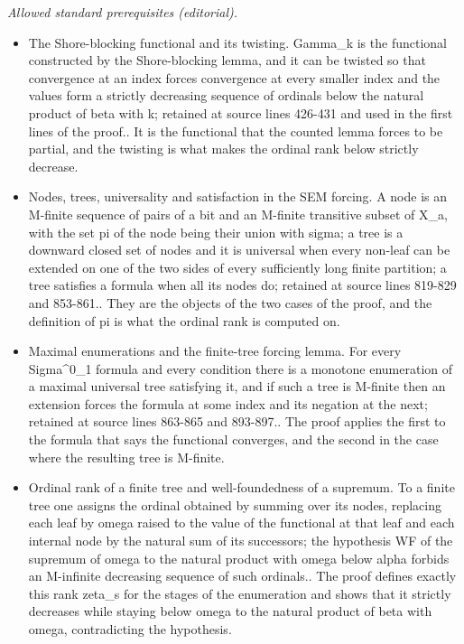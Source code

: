 \documentclass{article}
\numberwithin{theorem}{section}
\begin{document}
\noindent\textit{Allowed standard prerequisites (editorial).}\begin{itemize}
\item The Shore-blocking functional and its twisting. Gamma\_k is the functional constructed by the Shore-blocking lemma, and it can be twisted so that convergence at an index forces convergence at every smaller index and the values form a strictly decreasing sequence of ordinals below the natural product of beta with k; retained at source lines 426-431 and used in the first lines of the proof.. It is the functional that the counted lemma forces to be partial, and the twisting is what makes the ordinal rank below strictly decrease.
\item Nodes, trees, universality and satisfaction in the SEM forcing. A node is an M-finite sequence of pairs of a bit and an M-finite transitive subset of X\_a, with the set pi of the node being their union with sigma; a tree is a downward closed set of nodes and it is universal when every non-leaf can be extended on one of the two sides of every sufficiently long finite partition; a tree satisfies a formula when all its nodes do; retained at source lines 819-829 and 853-861.. They are the objects of the two cases of the proof, and the definition of pi is what the ordinal rank is computed on.
\item Maximal enumerations and the finite-tree forcing lemma. For every Sigma\textasciicircum{}0\_1 formula and every condition there is a monotone enumeration of a maximal universal tree satisfying it, and if such a tree is M-finite then an extension forces the formula at some index and its negation at the next; retained at source lines 863-865 and 893-897.. The proof applies the first to the formula that says the functional converges, and the second in the case where the resulting tree is M-finite.
\item Ordinal rank of a finite tree and well-foundedness of a supremum. To a finite tree one assigns the ordinal obtained by summing over its nodes, replacing each leaf by omega raised to the value of the functional at that leaf and each internal node by the natural sum of its successors; the hypothesis WF of the supremum of omega to the natural product with omega below alpha forbids an M-infinite decreasing sequence of such ordinals.. The proof defines exactly this rank zeta\_s for the stages of the enumeration and shows that it strictly decreases while staying below omega to the natural product of beta with omega, contradicting the hypothesis.
\end{itemize}\medskip
\end{document}
